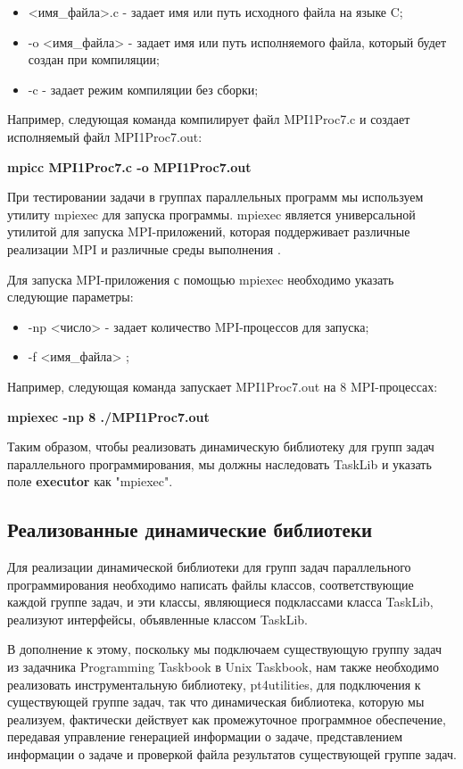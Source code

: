 \begin{itemize}
	\item <имя\_файла>.c - задает имя или путь исходного файла на языке C;
	\item -o <имя\_файла> - задает имя или путь исполняемого файла, который будет создан при компиляции;
	\item -c - задает режим компиляции без сборки;
\end{itemize}

 
 Например, следующая команда компилирует файл MPI1Proc7.c и создает исполняемый файл MPI1Proc7.out:
 
 \centerline{\textbf{mpicc MPI1Proc7.c -o MPI1Proc7.out}}

При тестировании задачи в группах параллельных программ мы используем утилиту mpiexec 
для запуска программы. mpiexec является универсальной утилитой для запуска 
MPI-приложений, которая поддерживает различные реализации MPI и различные среды выполнения \cite{ref6}.

Для запуска MPI-приложения с помощью mpiexec необходимо указать следующие параметры:

\begin{itemize}
	\item -np <число> - задает количество MPI-процессов для запуска;
	\item -f <имя\_файла> ;
\end{itemize}

Например, следующая команда запускает MPI1Proc7.out на 8 MPI-процессах:

\centerline{\textbf{mpiexec -np 8 ./MPI1Proc7.out}} 

Таким образом, чтобы реализовать динамическую библиотеку для групп задач параллельного 
программирования, мы должны наследовать TaskLib и указать поле \textbf{executor} как "mpiexec".

\subsection{Реализованные динамические библиотеки}

Для реализации динамической библиотеки для групп задач параллельного программирования
 необходимо написать файлы классов, соответствующие каждой группе задач, и эти 
 классы, являющиеся подклассами класса TaskLib, реализуют интерфейсы, объявленные классом TaskLib.

 В дополнение к этому, поскольку мы подключаем существующую группу задач из задачника Programming Taskbook 
 в Unix Taskbook, нам также необходимо реализовать инструментальную 
 библиотеку, pt4utilities, для подключения к существующей группе задач, так что динамическая 
 библиотека, которую мы реализуем, фактически действует как промежуточное программное обеспечение, 
 передавая управление генерацией информации о задаче, представлением информации о задаче и 
 проверкой файла результатов существующей группе задач.

